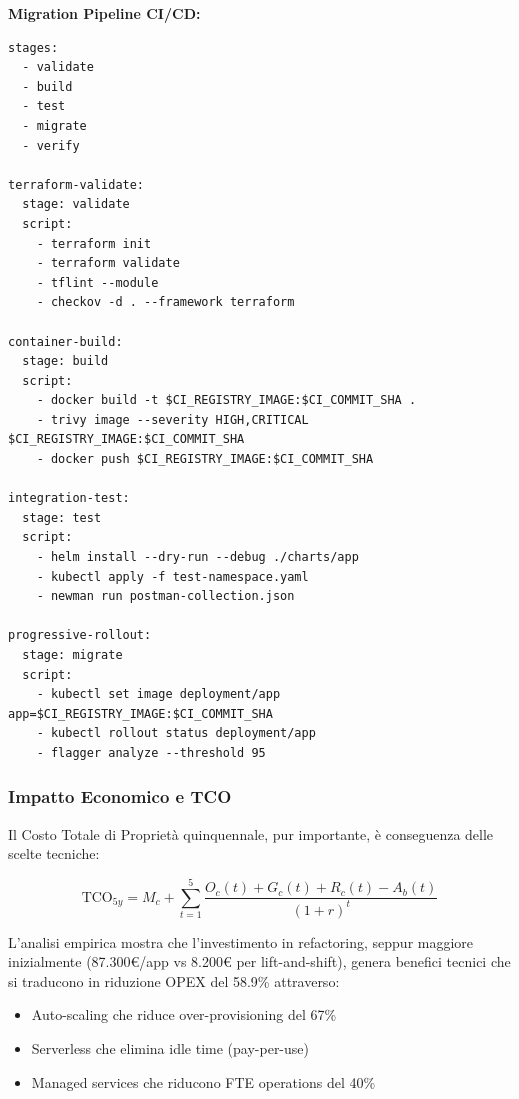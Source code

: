 \textbf{Migration Pipeline CI/CD:}
\begin{lstlisting}[caption={GitLab CI per Migrazione Progressiva},label={lst:migration_pipeline}]
stages:
  - validate
  - build
  - test
  - migrate
  - verify

terraform-validate:
  stage: validate
  script:
    - terraform init
    - terraform validate
    - tflint --module
    - checkov -d . --framework terraform

container-build:
  stage: build
  script:
    - docker build -t $CI_REGISTRY_IMAGE:$CI_COMMIT_SHA .
    - trivy image --severity HIGH,CRITICAL $CI_REGISTRY_IMAGE:$CI_COMMIT_SHA
    - docker push $CI_REGISTRY_IMAGE:$CI_COMMIT_SHA

integration-test:
  stage: test
  script:
    - helm install --dry-run --debug ./charts/app
    - kubectl apply -f test-namespace.yaml
    - newman run postman-collection.json

progressive-rollout:
  stage: migrate
  script:
    - kubectl set image deployment/app app=$CI_REGISTRY_IMAGE:$CI_COMMIT_SHA
    - kubectl rollout status deployment/app
    - flagger analyze --threshold 95
\end{lstlisting}

\subsubsection{\texorpdfstring{\textbf{Impatto Economico e TCO}}{3.4.1.4 - Impatto Economico e TCO}}

Il Costo Totale di Proprietà quinquennale, pur importante, è conseguenza delle scelte tecniche:

\begin{equation}
\text{TCO}_{5y} = M_c + \sum_{t=1}^{5} \frac{O_c(t) + G_c(t) + R_c(t) - A_b(t)}{(1+r)^t}
\end{equation}

L'analisi empirica mostra che l'investimento in refactoring, seppur maggiore inizialmente (87.300€/app vs 8.200€ per lift-and-shift), genera benefici tecnici che si traducono in riduzione OPEX del 58.9\% attraverso:
\begin{itemize}
    \item Auto-scaling che riduce over-provisioning del 67\%
    \item Serverless che elimina idle time (pay-per-use)
    \item Managed services che riducono FTE operations del 40\%
\end{itemize}

